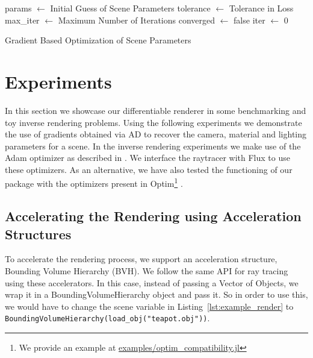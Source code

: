 \documentclass{juliacon}
\begin{document}
\begin{algorithm}[!htb]
\DontPrintSemicolon
\SetAlgoLined
{}
params $\gets$ Initial Guess of Scene Parameters\;
tolerance $\gets$ Tolerance in Loss\;
max\_iter $\gets$ Maximum Number of Iterations\;
converged $\gets$ false\;
iter $\gets$ 0\;
\;
\caption{Gradient Based Optimization of Scene Parameters}
\label{alg:inv_render}
\end{algorithm}

\section{Experiments}

In this section we showcase our differentiable renderer in some benchmarking and toy inverse rendering problems. Using the following experiments we demonstrate the use of gradients obtained via AD to recover the camera, material and lighting parameters for a scene. In the inverse rendering experiments we make use of the Adam optimizer as described in \cite{kingma2014adam}. We interface the raytracer with Flux to use these optimizers. As an alternative, we have also tested the functioning of our package with the optimizers present in Optim\footnote{\raggedright{We provide an example at \href{https://zenodo.org/record/1442781}{examples/optim\_compatibility.jl}}} \cite{K2018Optim}.

\subsection{Accelerating the Rendering using Acceleration Structures}

To accelerate the rendering process, we support an acceleration structure, Bounding Volume Hierarchy (BVH)\cite{Kay:1986:RTC:15922.15916}. We follow the same API for ray tracing using these accelerators. In this case, instead of passing a Vector of Objects, we wrap it in a BoundingVolumeHierarchy object and pass it. So in order to use this, we would have to change the scene variable in Listing~\ref{lst:example_render} to \lstinline{BoundingVolumeHierarchy(load_obj("teapot.obj"))}.
\end{document}

